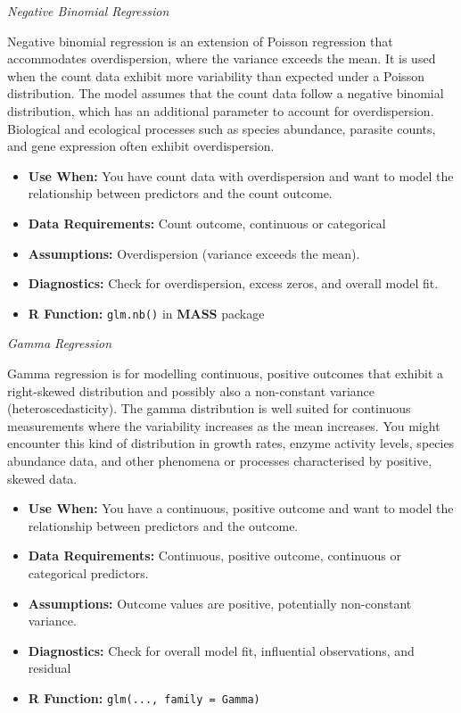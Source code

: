 \documentclass[
  letterpaper,
]{book}
\providecommand{\tightlist}{%
  \setlength{\itemsep}{0pt}\setlength{\parskip}{0pt}}\usepackage{longtable,booktabs,array}
\begin{document}
\emph{Negative Binomial Regression}

Negative binomial regression is an extension of Poisson regression that
accommodates overdispersion, where the variance exceeds the mean. It is
used when the count data exhibit more variability than expected under a
Poisson distribution. The model assumes that the count data follow a
negative binomial distribution, which has an additional parameter to
account for overdispersion. Biological and ecological processes such as
species abundance, parasite counts, and gene expression often exhibit
overdispersion.

\begin{itemize}
\tightlist
\item
  \textbf{Use When:} You have count data with overdispersion and want to
  model the relationship between predictors and the count outcome.
\item
  \textbf{Data Requirements:} Count outcome, continuous or categorical
\item
  \textbf{Assumptions:} Overdispersion (variance exceeds the mean).
\item
  \textbf{Diagnostics:} Check for overdispersion, excess zeros, and
  overall model fit.
\item
  \textbf{R Function:} \texttt{glm.nb()} in \textbf{MASS} package
\end{itemize}

\emph{Gamma Regression}

Gamma regression is for modelling continuous, positive outcomes that
exhibit a right-skewed distribution and possibly also a non-constant
variance (heteroscedasticity). The gamma distribution is well suited for
continuous measurements where the variability increases as the mean
increases. You might encounter this kind of distribution in growth
rates, enzyme activity levels, species abundance data, and other
phenomena or processes characterised by positive, skewed data.

\begin{itemize}
\tightlist
\item
  \textbf{Use When:} You have a continuous, positive outcome and want to
  model the relationship between predictors and the outcome.
\item
  \textbf{Data Requirements:} Continuous, positive outcome, continuous
  or categorical predictors.
\item
  \textbf{Assumptions:} Outcome values are positive, potentially
  non-constant variance.
\item
  \textbf{Diagnostics:} Check for overall model fit, influential
  observations, and residual
\item
  \textbf{R Function:} \texttt{glm(...,\ family\ =\ Gamma)}
\end{itemize}
\end{document}
